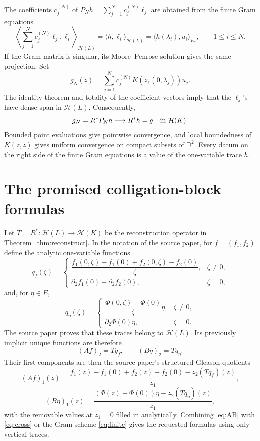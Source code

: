 \documentclass[11pt]{article}
\newcommand{\D}{\mathbb D}
\newcommand{\Hk}{\mathcal H(K)}
\newcommand{\Hl}{\mathcal H(L)}
\begin{document}
The coefficients \(c^{(N)}_j\) of \(P_Nh=\sum_{j=1}^N
c^{(N)}_j\ell_j\) are obtained from the finite Gram equations
\[
\left\langle\sum_{j=1}^N c^{(N)}_j\ell_j,\ell_i\right\rangle_{\Hl}
=\langle h,\ell_i\rangle_{\Hl}
=\langle h(\lambda_i),u_i\rangle_{E_*},
\qquad 1\leq i\leq N.
\]
If the Gram matrix is singular, its Moore--Penrose solution gives the
same projection.  Set
\begin{equation}
\label{eq:finite}
g_N(z)=\sum_{j=1}^N c^{(N)}_jK(z,(0,\lambda_j))u_j.
\end{equation}
The identity theorem and totality of the coefficient vectors imply that
the \(\ell_j\)'s have dense span in \(\Hl\).  Consequently,
\[
g_N=R^*P_Nh\longrightarrow R^*h=g
\quad\hbox{in }\Hk.
\]
Bounded point evaluations give pointwise convergence, and local boundedness
of \(K(z,z)\) gives uniform convergence on compact subsets of \(\D^2\).
Every datum on the right side of the finite Gram equations is a value of
the one-variable trace \(h\).

\section{The promised colligation-block formulas}

Let \(T=R^*:\Hl\to\Hk\) be the reconstruction operator in
Theorem~\ref{thm:reconstruct}.  In the notation of the source paper, for
\(f=(f_1,f_2)\) define the analytic one-variable functions
\[
q_f(\zeta)=
\begin{cases}
\dfrac{f_1(0,\zeta)-f_1(0)+f_2(0,\zeta)-f_2(0)}{\zeta},
&\zeta\ne0,\\[6pt]
\partial_2f_1(0)+\partial_2f_2(0),&\zeta=0,
\end{cases}
\]
and, for \(\eta\in E\),
\[
q_\eta(\zeta)=
\begin{cases}
\dfrac{\Phi(0,\zeta)-\Phi(0)}{\zeta}\eta,&\zeta\ne0,\\[6pt]
\partial_2\Phi(0)\eta,&\zeta=0.
\end{cases}
\]
The source paper proves that these traces belong to \(\Hl\).  Its
previously implicit unique functions are therefore
\begin{equation}
\label{eq:AB}
(Af)_2=Tq_f,\qquad (B\eta)_2=Tq_\eta.
\end{equation}
Their first components are then the source paper's structured Gleason
quotients
\[
(Af)_1(z)=
\frac{f_1(z)-f_1(0)+f_2(z)-f_2(0)-z_2(Tq_f)(z)}{z_1},
\]
\[
(B\eta)_1(z)=
\frac{(\Phi(z)-\Phi(0))\eta-z_2(Tq_\eta)(z)}{z_1},
\]
with the removable values at \(z_1=0\) filled in analytically.
Combining \eqref{eq:AB} with \eqref{eq:cross} or the Gram scheme
\eqref{eq:finite} gives the requested formulas using only vertical traces.
\end{document}
